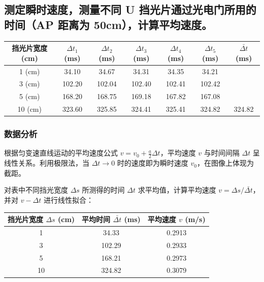 \documentclass[11pt]{article}
\begin{document}
\subsection{测定瞬时速度，测量不同 U 挡光片通过光电门所用的时间（AP 距离为 50cm），计算平均速度。}

\begin{table}[h]
    \centering
    \begin{tabular}{ccccccc}
        \toprule
        挡光片宽度 (cm) & $\Delta t_1$ (ms) & $\Delta t_2$ (ms) & $\Delta t_3$ (ms) & $\Delta t_4$ (ms) & $\Delta t_5$ (ms) & $\bar{\Delta t}$ (ms) \\
        \midrule
        1 (cm)  & 34.10  & 34.67  & 34.31  & 34.35  & 34.21  & \\
        3 (cm)  & 102.20 & 102.04 & 102.40 & 102.41 & 102.42 & \\
        5 (cm)  & 168.20 & 168.75 & 169.18 & 167.82 & 167.08 & \\
        10 (cm) & 323.60 & 325.85 & 324.41 & 325.41 & 324.82 & 324.82 \\
        \bottomrule
    \end{tabular}
\end{table}

\subsubsection{数据分析}
根据匀变速直线运动的平均速度公式 $v = v_0 + \frac{a}{2}\Delta t$，平均速度 $v$ 与时间间隔 $\Delta t$ 呈线性关系。利用极限法，当 $\Delta t \to 0$ 时的速度即为瞬时速度 $v_0$，在图像上体现为截距。

对表中不同挡光宽度 $\Delta s$ 所测得的时间 $\Delta t$ 求平均值，计算平均速度 $v = \Delta s / \bar{\Delta t}$，并对 $v-\Delta t$ 进行线性拟合：

\begin{table}[H]
    \centering
    \begin{tabular}{ccc}
        \toprule
        挡光片宽度 $\Delta s$ (cm) & 平均时间 $\bar{\Delta t}$ (ms) & 平均速度 $v$ (m/s) \\
        \midrule
        1 & 34.33 & 0.2913 \\
        3 & 102.29 & 0.2933 \\
        5 & 168.21 & 0.2973 \\
        10 & 324.82 & 0.3079 \\
        \bottomrule
    \end{tabular}
\end{table}
\end{document}
